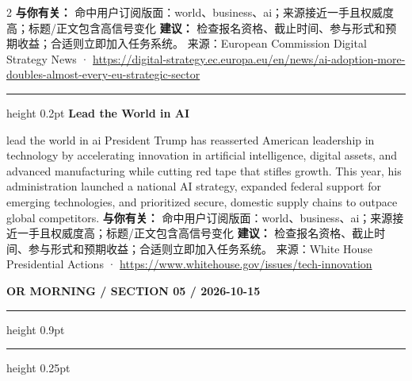 \documentclass[10.5pt]{ctexart}
\begin{document}
\begin{multicols}{2}
\textbf{与你有关：} 命中用户订阅版面：world、business、ai；来源接近一手且权威度高；标题/正文包含高信号变化
\textbf{建议：} 检查报名资格、截止时间、参与形式和预期收益；合适则立即加入任务系统。
{\footnotesize\color{ormuted} 来源：European Commission Digital Strategy News · \url{https://digital-strategy.ec.europa.eu/en/news/ai-adoption-more-doubles-almost-every-eu-strategic-sector}}
\vspace{2mm}
\hrule height 0.2pt
\vspace{2mm}
{\large\bfseries Lead the World in AI}\par
lead the world in ai President Trump has reasserted American leadership in technology by accelerating innovation in artificial intelligence, digital assets, and advanced manufacturing while cutting red tape that stifles growth. This year, his administration launched a national AI strategy, expanded federal support for emerging technologies, and prioritized secure, domestic supply chains to outpace global competitors.
\textbf{与你有关：} 命中用户订阅版面：world、business、ai；来源接近一手且权威度高；标题/正文包含高信号变化
\textbf{建议：} 检查报名资格、截止时间、参与形式和预期收益；合适则立即加入任务系统。
{\footnotesize\color{ormuted} 来源：White House Presidential Actions · \url{https://www.whitehouse.gov/issues/tech-innovation}}
\end{multicols}
\newpage
{\small\bfseries OR MORNING / SECTION 05 / 2026-10-15}
\vspace{2mm}
\hrule height 0.9pt
\vspace{1.5mm}
\hrule height 0.25pt
\vspace{4mm}
\end{document}

